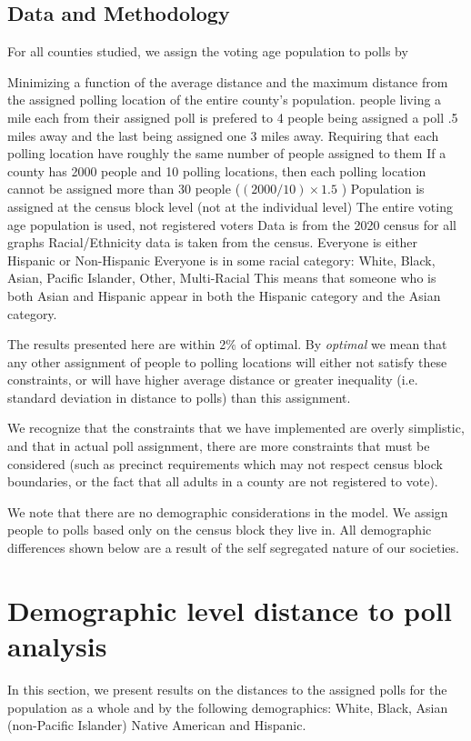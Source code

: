 \documentclass[11pt]{article}
\theoremstyle{remark}
\theoremstyle{definition}
\begin{document}
	
\subsection{Data and Methodology}
	For all counties studied, we assign the voting age population to polls by 
\begin{outline}
	\1 Minimizing a function of the average distance and the maximum distance from the assigned polling location of the entire county's population.
		 people living a mile each from their assigned poll is prefered to 4 people being assigned a poll .5 miles away and the last being assigned one 3 miles away.
	\1 Requiring that each polling location have roughly the same number of people assigned to them
		\2 If a county has 2000 people and 10 polling locations, then each polling location cannot be assigned more than 30 people ($(2000 / 10) \times 1.5$ )
	\1 Population is assigned at the census block level (not at the individual level)
		\2 The entire voting age population is used, not registered voters
		\2 Data is from the 2020 census for all graphs
		\2 Racial/Ethnicity data is taken from the census.
			\3 Everyone is either Hispanic or Non-Hispanic
			\3 Everyone is in some racial category: White, Black, Asian, Pacific Islander, Other, Multi-Racial
			\3 This means that someone who is both Asian and Hispanic appear in both the Hispanic category and the Asian category.
\end{outline}

The results presented here are within 2$\%$ of optimal. By \emph{optimal} we mean that any other assignment of people to polling locations will either not satisfy these constraints, or will have higher average distance or greater inequality (i.e. standard deviation in distance to polls) than this assignment. 

We recognize that the constraints that we have implemented are overly simplistic, and that in actual poll assignment, there are more constraints that must be considered (such as precinct requirements which may not respect census block boundaries, or the fact that all adults in a county are not registered to vote).

We note that there are no demographic considerations in the model. We assign people to polls based only on the census block they live in. All demographic differences shown below are a result of the self segregated nature of our societies.


\section{Demographic level distance to poll analysis \label{sec:distances}}
In this section, we present results on the distances to the assigned polls for the population as a whole and by the following demographics: White, Black, Asian (non-Pacific Islander) Native American and Hispanic.
\end{document}
